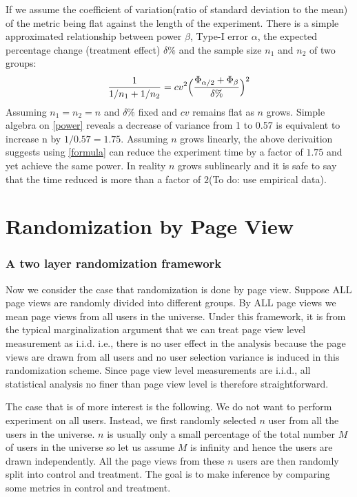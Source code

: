 \documentclass[12pt,letterpaper]{article}
\begin{document}
If we assume the coefficient of variation(ratio of standard deviation to the mean) of the metric being flat against the length of the experiment. There is a simple approximated relationship between power $\beta$, Type-I error $\alpha$, the expected percentage change (treatment effect) $\delta\%$ and the sample size $n_1$ and $n_2$ of two groups:
\begin{align}\label{power}
\frac{1}{1/n_1+1/n_2}= cv^2\Bigl(\frac{\Phi_{\alpha/2}+\Phi_\beta}{\delta\%}\Bigr)^2
\end{align}  
Assuming $n_1=n_2=n$ and $\delta\%$ fixed and $cv$ remains flat as $n$ grows. Simple algebra on \eqref{power} reveals a decrease of variance from 1 to 0.57 is equivalent to increase n by $1/0.57=1.75$. Assuming $n$ grows linearly, the above derivaition suggests using \ref{formula} can reduce the experiment time by  a factor of $1.75$ and yet achieve the same power. In reality $n$ grows sublinearly and it is safe to say that the time reduced is more than a factor of $2$(To do: use empirical data). 


\part{Randomization by Page View}
\section{A two layer randomization framework}
Now we consider the case that randomization is done by page view. Suppose ALL page views are randomly divided into different groups. By ALL page views we mean page views from all users in the universe. Under this framework, it is from the typical marginalization argument that we can treat page view level measurement as i.i.d. i.e., there is no user effect in the analysis because the page views are drawn from all users and no user selection variance is induced in this randomization scheme. Since page view level measurements are i.i.d., all statistical analysis no finer than page view level is therefore straightforward. 

The case that is of more interest is the following. We do not want to perform experiment on all users. Instead, we first randomly selected $n$ user from all the users in the universe. $n$ is usually only a small percentage of the total number $M$ of users in the universe so let us assume $M$ is infinity and hence the users are drawn independently. All the page views from these $n$ users are then randomly split into control and treatment. The goal is to make inference by comparing some metrics in control and treatment. 
\end{document}
